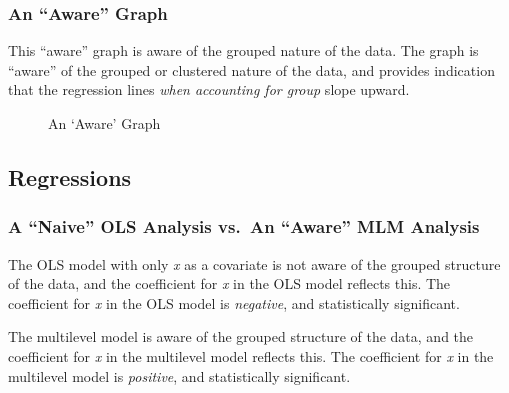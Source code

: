\documentclass[
  letterpaper,
  DIV=11,
  numbers=noendperiod]{scrreprt}
\begin{document}
\subsubsection{An ``Aware'' Graph}\label{an-aware-graph}

This ``aware'' graph is aware of the grouped nature of the data. The
graph is ``aware'' of the grouped or clustered nature of the data, and
provides indication that the regression lines \emph{when accounting for
group} slope upward.

\begin{figure}


\caption{\label{fig-aware}An `Aware' Graph}

\end{figure}%

\subsection{Regressions}\label{regressions}

\subsubsection{A ``Naive'' OLS Analysis vs.~An ``Aware'' MLM
Analysis}\label{a-naive-ols-analysis-vs.-an-aware-mlm-analysis}

The OLS model with only \emph{x} as a covariate is not aware of the
grouped structure of the data, and the coefficient for \emph{x} in the
OLS model reflects this. The coefficient for \emph{x} in the OLS model
is \emph{negative}, and statistically significant.

The multilevel model is aware of the grouped structure of the data, and
the coefficient for \emph{x} in the multilevel model reflects this. The
coefficient for \emph{x} in the multilevel model is \emph{positive}, and
statistically significant.
\end{document}
